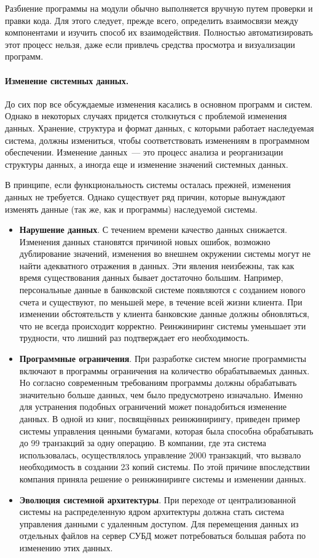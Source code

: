 \documentclass{../../text-style}
\begin{document}
Разбиение программы на модули обычно выполняется вручную путем проверки и правки кода. Для этого следует, прежде всего, определить взаимосвязи между компонентами и изучить способ их взаимодействия. Полностью автоматизировать этот процесс нельзя, даже если привлечь средства просмотра и визуализации программ.

\paragraph{Изменение системных данных.} До сих пор все обсуждаемые изменения касались в основном программ и систем. Однако в некоторых случаях придется столкнуться с проблемой изменения данных. Хранение, структура и формат данных, с которыми работает наследуемая система, должны измениться, чтобы соответствовать изменениям в программном обеспечении. Изменение данных~--- это процесс анализа и реорганизации структуры данных, а иногда еще и изменение значений системных данных.

В принципе, если функциональность системы осталась прежней, изменения данных не требуется. Однако существует ряд причин, которые вынуждают изменять данные (так же, как и программы) наследуемой системы.

\begin{itemize}
    \item \textbf{Нарушение данных}. С течением времени качество данных снижается. Изменения данных становятся причиной новых ошибок, возможно дублирование значений, изменения во внешнем окружении системы могут не найти адекватного отражения в данных. Эти явления неизбежны, так как время существования данных бывает достаточно большим. Например, персональные данные в банковской системе появляются с созданием нового счета и существуют, по меньшей мере, в течение всей жизни клиента. При изменении обстоятельств у клиента банковские данные должны обновляться, что не всегда происходит корректно. Реинжиниринг системы уменьшает эти трудности, что лишний раз подтверждает его необходимость.
    \item \textbf{Программные ограничения}. При разработке систем многие программисты включают в программы ограничения на количество обрабатываемых данных. Но согласно современным требованиям программы должны обрабатывать значительно больше данных, чем было предусмотрено изначально. Именно для устранения подобных ограничений может понадобиться изменение данных. В одной из книг, посвящённых реинжинирингу, приведен пример системы управления ценными бумагами, которая была способна обрабатывать до 99 транзакций за одну операцию. В компании, где эта система использовалась, осуществлялось управление 2000 транзакций, что вызвало необходимость в создании 23 копий системы. По этой причине впоследствии компания приняла решение о реинжиниринге системы и изменении данных.
    \item \textbf{Эволюция системной архитектуры}. При переходе от централизованной системы на распределенную ядром архитектуры должна стать система управления данными с удаленным доступом. Для перемещения данных из отдельных файлов на сервер СУБД может потребоваться большая работа по изменению этих данных.
\end{itemize}
\end{document}
